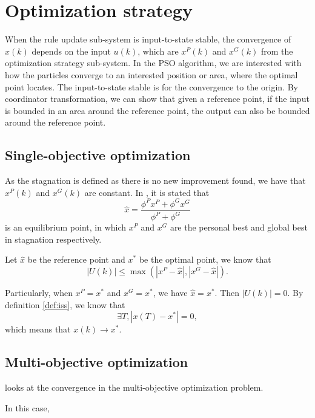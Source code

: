 \section{Optimization strategy}

When the rule update sub-system is input-to-state stable, the convergence of $ x(k) $ depends on the input $ u(k) $, which are $ x^{P}(k) $ and $ x^{G}(k) $ from the optimization strategy sub-system.
In the PSO algorithm, we are interested with how the particles converge to an interested position or area, where the optimal point locates.
The input-to-state stable is for the convergence to the origin.
By coordinator transformation, we can show that given a reference point, if the input is bounded in an area around the reference point, the output can also be bounded around the reference point.


\subsection{Single-objective optimization}

As the stagnation is defined as there is no new improvement found, we have that $ x^{P}(k) $ and $ x^{G}(k) $ are constant.
In \cite{985692}, it is stated that
\begin{equation}
\label{eq:single_obj_equilibrium}
\hat{x} = \frac{\phi^{P} x^{P} + \phi^{G} x^{G} }{ \phi^{P} + \phi^{G} } 
\end{equation}
 is an equilibrium point, in which $ x^{P} $ and $ x^{G} $ are the personal best and global best in stagnation respectively.

Let $ \hat{x} $ be the reference point and $ x^{*} $ be the optimal point, we know that 
\begin{equation}
\label{eq:single_obj_input_bound}
| U(k) | \leq \max (| x^{P} - \hat{x} |, | x^{G} - \hat{x} |).
\end{equation}



Particularly, when $ x^{P} = x^{*} $ and $ x^{G} = x^{*} $, we have
$ \hat{x} = x^{*} $.
Then $ | U(k) | = 0 $.
By definition \eqref{def:iss}, we know that
\begin{equation}
\label{eq:single_obj_convergence}
\exists T , | x(T) - x^{*} |  = 0,
\end{equation}
which means that $ x(k) \rightarrow x^{*} $. 

\subsection{Multi-objective optimization}
\cite{Chakraborty20111411} looks at the convergence in the multi-objective optimization problem.

In this case, 
